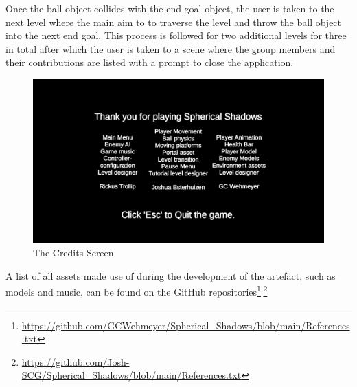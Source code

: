 \noindent Once the ball object collides with the end goal object, the user is taken to the next level where the main aim to to traverse the level and throw the ball object into the next end goal. This process is followed for two additional levels for three in total  after which the user is taken to a scene where the group members and their contributions are listed with a prompt to close the application.

\begin{figure}[H]
\centering
\centerline{\includegraphics[scale=0.25]{Figures/credits.png}}
\caption{The Credits Screen}
\end{figure}

\noindent A list of all assets made use of during the development of the artefact, such as models and music, can be found on the GitHub repositories\footnote{\url{https://github.com/GCWehmeyer/Spherical_Shadows/blob/main/References.txt}}$^{,}$\footnote{\url{https://github.com/Josh-SCG/Spherical_Shadows/blob/main/References.txt}} 
